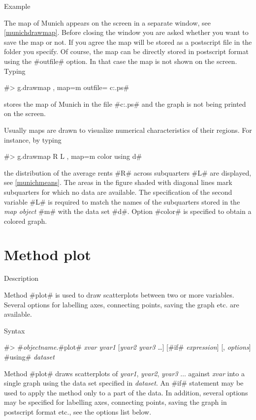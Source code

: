 \begin{stanza}{Example}
{The map of Munich appears on the screen in a separate window, see
\autoref{munichdrawmap}. Before closing the window you are asked
whether you want to save the map or not. If you agree the map will
be stored as a postscript file in the folder you specify. Of
course, the map can be directly stored in postscript format
using the #outfile# option. In that case the map is not shown on the screen. Typing

#> g.drawmap , map=m outfile= c:\temp\munich.ps#

stores the map of Munich in the file
#c:\temp\munich.ps# and the graph is not
being printed on the screen.

Usually maps are drawn to visualize numerical characteristics of
their regions. For instance,
by typing

#> g.drawmap R L , map=m color using d#

the distribution of the average rents #R# across subquarters #L#
are displayed, see \autoref{munichmeans}. The areas in the figure
shaded with diagonal lines mark subquarters for which  no data are
available. The specification of the second variable #L# is
required to match the names of the subquarters stored in the {\em map
object} #m# with the data set #d#. Option #color# is specified to
obtain a colored graph.}
\end{stanza}



\clearpage



\section{Method plot}
\label{graphplot} 
 

\begin{stanza}{Description}

{Method #plot# is used to draw scatterplots between two or more
variables. Several options for labelling axes, connecting points,
saving the graph etc. are available.}
\end{stanza}

\begin{stanza}{Syntax}

{#> #{\em objectname}.#plot#  {\em xvar yvar1} [{\em yvar2 yvar3}
\dots]
[#if# {\em expression}] [, {\em options}] #using# {\em dataset}

Method #plot# draws scatterplots of {\em yvar1}, {\em yvar2}, {\em
yvar3} $\dots$ against {\em xvar} into a single graph using the
data set specified in {\em dataset}. An #if# statement may be used
to apply the method only to a part of the data. In addition,
several options may be specified for labelling axes, connecting
points, saving the graph in postscript format etc., see the
options list below.}
\end{stanza}

